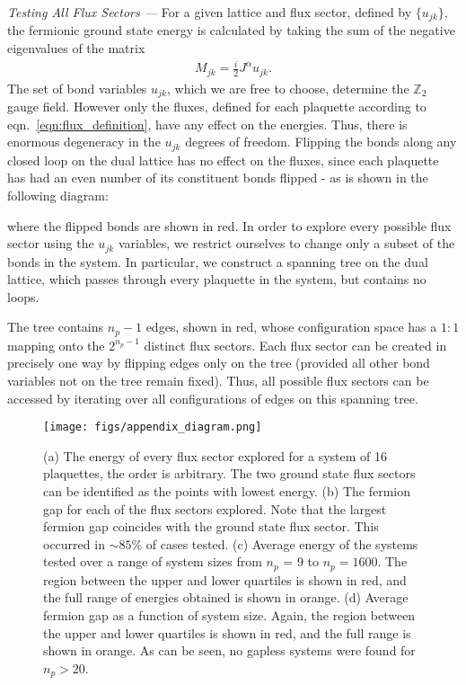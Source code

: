 {\it Testing All Flux Sectors ---}
For a given lattice and flux sector, defined by $\{ u_{jk}\}$, the fermionic ground state energy is calculated by taking the sum of the negative eigenvalues of the matrix
\begin{align}
    M_{jk} = \frac{i}{2} J^{\alpha} u_{jk}.
\end{align}
The set of bond variables $u_{jk}$, which we are free to choose, determine the $\mathbb Z_2$ gauge field. However only the fluxes, defined for each plaquette according to eqn.~\ref{eqn:flux_definition}, have any effect on the energies. Thus, there is enormous degeneracy in the $u_{jk}$ degrees of freedom. Flipping the bonds along any closed loop on the dual lattice has no effect on the fluxes, since each plaquette has had an even number of its constituent bonds flipped - as is shown in the following diagram:
\begin{center}
    
\end{center}
where the flipped bonds are shown in red. In order to explore every possible flux sector using the $u_{jk}$ variables, we restrict ourselves to change only a subset of the bonds in the system. In particular, we construct a spanning tree on the dual lattice, which passes through every plaquette in the system, but contains no loops. 
\begin{center}
    
\end{center}
The tree contains $n_p - 1$ edges, shown in red, whose configuration space has a $1:1$ mapping onto the $2^{n_p - 1}$ distinct flux sectors. Each flux sector can be created in precisely one way by flipping edges only on the tree (provided all other bond variables not on the tree remain fixed). Thus, all possible flux sectors can be accessed by iterating over all configurations of edges on this spanning tree.

\begin{figure*}[t]
    \centering
    \texttt{[image: figs/appendix\_diagram.png]}
    \caption{(a) The energy of every flux sector explored for a system of 16 plaquettes, the order is arbitrary. The two ground state flux sectors can be identified as the points with lowest energy. (b) The fermion gap for each of the flux sectors explored. Note that the largest fermion gap coincides with the ground state flux sector. This occurred in $\sim 85\%$ of cases tested. (c) Average energy of the systems tested over a range of system sizes from $n_p$ = 9 to $n_p = 1600$. The region between the upper and lower quartiles is shown in red, and the full range of energies obtained is shown in orange. (d) Average fermion gap as a function of system size. Again, the region between the upper and lower quartiles is shown in red, and the full range is shown in orange. As can be seen, no gapless systems were found for $n_p > 20$. }
    \label{fig:energy_gaps_example}
\end{figure*}


